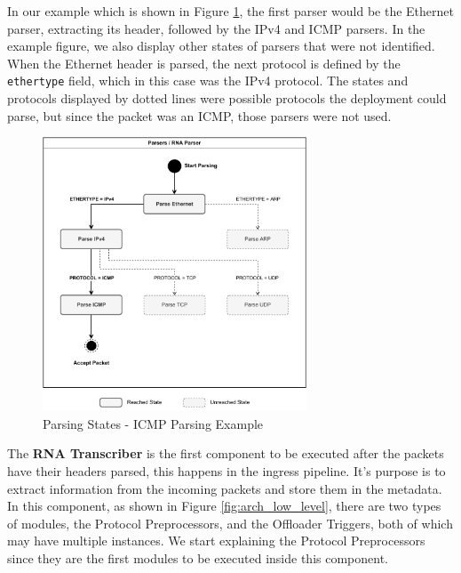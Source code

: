In our example which is shown in Figure \ref{fig:icmp_ex_parser}, the first parser would be the Ethernet parser, extracting its header, followed by the IPv4 and ICMP parsers. In the example figure, we also display other states of parsers that were not identified. When the Ethernet header is parsed, the next protocol is defined by the \texttt{ethertype} field, which in this case was the IPv4 protocol. The states and protocols displayed by dotted lines were possible protocols the deployment could parse, but since the packet was an ICMP, those parsers were not used.

\begin{figure}[ht]
    \caption{Parsing States - ICMP Parsing Example}
    \begin{center}
        \includegraphics[width=0.7\textwidth]{images/icmp_ex_parser.pdf}  
    \end{center}
    \label{fig:icmp_ex_parser}
\end{figure}



The \textbf{RNA Transcriber} is the first component to be executed after the packets have their headers parsed, this happens in the ingress pipeline. It's purpose is to extract information from the incoming packets and store them in the metadata. In this component, as shown in Figure \ref{fig:arch_low_level}, there are two types of modules, the Protocol Preprocessors, and the Offloader Triggers, both of which may have multiple instances. We start explaining the Protocol Preprocessors since they are the first modules to be executed inside this component.

